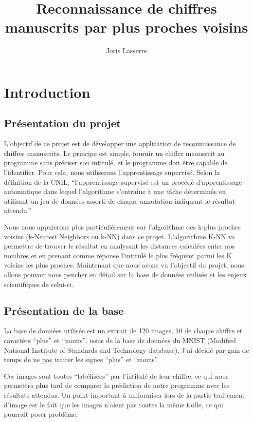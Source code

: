 \documentclass{article}
\title{Reconnaissance de chiffres manuscrits par plus proches voisins}
\author{Joris Lasserre}
\date{}
\begin{document}
\maketitle

\section{Introduction}

\subsection{Présentation du projet}
L'objectif de ce projet est de développer une application de reconnaissance de chiffres manuscrits. Le principe est simple, fournir un chiffre manuscrit au programme sans préciser son intitulé, et le programme doit être capable de l'identifier. Pour cela, nous utiliserons l'apprentissage supervisé. Selon la définition de la CNIL, ``l'apprentissage supervisé est un procédé d'apprentissage automatique dans lequel l'algorithme s'entraîne à une tâche déterminée en utilisant un jeu de données assorti de chaque annotation indiquant le résultat attendu.'' 

Nous nous appuierons plus particulièrement sur l'algorithme des k-plus proches voisins (k-Nearest Neighbors ou k-NN) dans ce projet. L'algorithme K-NN va permettre de trouver le résultat en analysant les distances calculées entre nos nombres et en prenant comme réponse l'intitulé le plus fréquent parmi les K voisins les plus proches. Maintenant que nous avons vu l'objectif du projet, nous allons pouvoir nous pencher en détail sur la base de données utilisée et les enjeux scientifiques de celui-ci. 

\subsection{Présentation de la base}
La base de données utilisée est un extrait de 120 images, 10 de chaque chiffre et caractère ``plus'' et ``moins'', issus de la base de données du MNIST (Modified National Institute of Standards and Technology database). J'ai décidé par gain de temps de ne pas traiter les signes ``plus'' et ``moins''. 

Ces images sont toutes ``labélisées'' par l'intitulé de leur chiffre, ce qui nous permettra plus tard de comparer la prédiction de notre programme avec les résultats attendus. Un point important à uniformiser lors de la partie traitement d'image est le fait que les images n'aient pas toutes la même taille, ce qui pourrait poser problème. 
\end{document}
